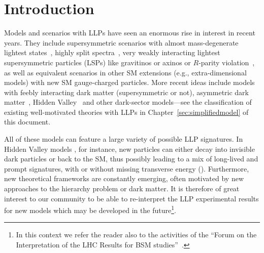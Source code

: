 
\section{Introduction}
\label{sec:ch5-introduction}

Models and scenarios with LLPs have seen an enormous rise in interest in recent years.
They include supersymmetric scenarios with almost mass-degenerate lightest states~\cite{Chen:1995yu,Feng:1999fu},
highly split spectra~\cite{ArkaniHamed:2004fb,Giudice:2004tc}, very weakly interacting
lightest supersymmetric particles (LSPs) like gravitinos or
axinos \cite{Pagels:1981ke,Covi:1999ty} or $R$-parity violation~\cite{Barbier:2004ez},
as well as equivalent scenarios in other SM extensions (e.g., extra-dimensional models) with new SM gauge-charged particles.
More recent ideas include models with feebly interacting dark matter \cite{Hall:2009bx} (supersymmetric or not), asymmetric dark matter~\cite{Zurek:2013wia}, Hidden Valley~\cite{Strassler:2006im} and other dark-sector models---see the classification of existing well-motivated theories with LLPs in Chapter~\ref{sec:simplifiedmodel} of this document.

All of these models can feature a large variety of possible LLP signatures. In Hidden Valley models \cite{Strassler:2006im}, for instance,
new particles can either decay into invisible dark particles or back to the SM, thus possibly leading to a
mix of long-lived and prompt signatures, with or without missing transverse energy (\MET).
Furthermore, new theoretical frameworks are constantly emerging, often motivated by
new approaches to the hierarchy problem or dark matter.
It is therefore of great interest to our community to be able to
re-interpret the LLP experimental results
for new models which may be developed in the future\footnote{In this context we refer the reader also to
the activities of the ``Forum on the Interpretation of the LHC Results for BSM studies''~\cite{reinterpretationForum}.}.

